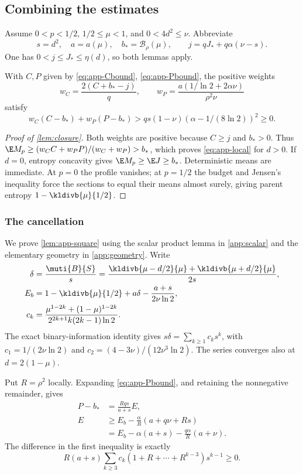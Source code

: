 \subsection{Combining the estimates}
Assume $0<p<1/2$, $1/2\le\mu<1$, and $0<4d^2\le\nu$. Abbreviate
\[
 s=d^2,\quad a=a(\mu),\quad b_*=\mathcal B_\rho(\mu),
 \qquad j=qJ_*+q\alpha(\nu-s).
\]
One has $0<j\le J_*\le\eta(d)$, so both lemmas apply. 
\begin{proposition}\label{lem:app-square}
With $C,P$ given by \eqref{eq:app-Cbound}, \eqref{eq:app-Pbound}, the positive weights
\[
 w_C=\frac{2(C+b_*-j)}q,\qquad
 w_P=\frac{a(1/\ln2+2\alpha \nu)}{\rho^2\nu}
\]
satisfy
\begin{equation}\label{eq:app-squarebound}
 w_C(C-b_*)+w_P(P-b_*)>qs(1-\nu)(\alpha-1/(8\ln2))^2\ge0.
\end{equation}
\end{proposition}
\begin{proof}[Proof of \autoref{lem:closure}]
Both weights are positive because $C\ge j$ and $b_*>0$. Thus $\E
M_p\ge(w_CC+w_PP)/(w_C+w_P)>b_*$, which proves \eqref{eq:app-local} for $d>0$.
If $d=0$, entropy concavity gives $\E M_p\ge\E J\ge b_*$. Deterministic means
are immediate. At $p=0$ the profile vanishes; at $p=1/2$ the budget and
Jensen's inequality force the sections to equal their means almost surely,
giving parent entropy $1-\kldivb{\mu}{1/2}$.
\end{proof}

\subsubsection*{The cancellation}
We prove \autoref{lem:app-square} using the scalar product lemma in
\autoref{app:scalar} and the elementary geometry in \autoref{app:geometry}.
Write
\begin{align*}
 \delta&=\frac{\muti{B}{S}}s
 =\frac{\kldivb{\mu-d/2}{\mu}+\kldivb{\mu+d/2}{\mu}}{2s},\\
 E_b&=1-\kldivb{\mu}{1/2}+a\delta-\frac{a+s}{2\nu\ln2},\\
 c_k&=\frac{\mu^{1-2k}+(1-\mu)^{1-2k}}{2^{2k+1}k(2k-1)\ln2}.
\end{align*}
The exact binary-information identity gives $s\delta=\sum_{k\ge1}c_ks^k$, with
$c_1=1/(2\nu\ln2)$ and $c_2=(4-3\nu)/(12\nu^3\ln2)$. The series converges also at $d=2(1-\mu)$.

Put $R=\rho^2$ locally. Expanding \eqref{eq:app-Pbound}, and retaining the
nonnegative remainder, gives
\begin{align}
 P-b_*&=\frac{Rqs}{a+s}E,\\
 E&\ge E_b-\frac\alpha R(a+q\nu+Rs)\nonumber\\
   &=E_b-\alpha(a+s)-\frac{q\alpha}R(a+\nu).
 \label{eq:app-Ebound}
\end{align}
The difference in the first inequality is exactly
\[
 R(a+s)\sum_{k\ge3}c_k(1+R+\cdots+R^{k-3})s^{k-1}\ge0.
\]

